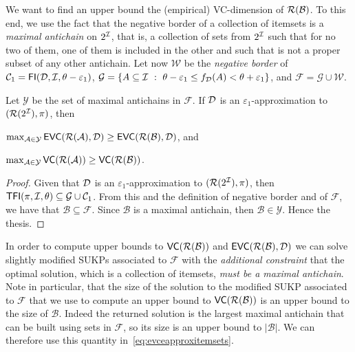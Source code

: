We want to find an upper bound the (empirical) VC-dimension of
$\mathcal{R}(\mathcal{B})$. To this end, we use the fact that the negative border of
a collection of itemsets is a \emph{maximal antichain} on $2^{\cal I}$, that is, a
collection of sets from $2^{\cal I}$ such that for no two of them, one of them is
included in the other and such that is not a proper subset of any other
antichain. Let now $\mathcal{W}$ be the \emph{negative border} of
$\mathcal{C}_1=\mathsf{FI}({\cal D},{\cal I},\theta-\varepsilon_1)$,
$\mathcal{G}=\{A\subseteq{\cal I} ~:~ \theta-\varepsilon_1\le
f_{\cal D}(A)<\theta+\varepsilon_1\}$, and $\mathcal{F}=\mathcal{G}\cup\mathcal{W}$.

\begin{lemma}\label{lem:antichains}
  Let $\mathcal{Y}$ be the set of maximal antichains in $\mathcal{F}$. If
  ${\cal D}$ is an $\varepsilon_1$-approximation to $(\mathcal{R}(2^{\cal I}),\pi)$, then
  \begin{enumerate*}
    \item
      $\max_{\mathcal{A}\in\mathcal{Y}}\mathsf{EVC}(\mathcal{R}(\mathcal{A}),{\cal D})\ge\mathsf{EVC}(\mathcal{R}(\mathcal{B}),{\cal D})$,
      and
    \item
      $\max_{\mathcal{A}\in\mathcal{Y}}\mathsf{VC}(\mathcal{R}(\mathcal{A}))\ge\mathsf{VC}(\mathcal{R}(\mathcal{B}))$.
  \end{enumerate*}
\end{lemma}

\begin{proof}
  Given that ${\cal D}$ is an $\varepsilon_1$-approximation to
  $(\mathcal{R}(2^{\cal I}),\pi)$, then
  $\mathsf{TFI}(\pi,{\cal I},\theta)\subseteq\mathcal{G}\cup\mathcal{C}_1$.  From this and
  the definition of negative border and of $\mathcal{F}$, we have that
  $\mathcal{B}\subseteq\mathcal{F}$. Since $\mathcal{B}$ is a maximal antichain,
  then $\mathcal{B}\in\mathcal{Y}$. Hence the thesis.
\end{proof}

In order to compute upper bounds to $\mathsf{VC}(\mathcal{R}(\mathcal{B}))$ and
$\mathsf{EVC}(\mathcal{R}(\mathcal{B}),{\cal D})$ we can solve slightly modified SUKPs
associated to $\mathcal{F}$ with the \emph{additional constraint} that the
optimal solution, which is a collection of itemsets, \emph{must be a maximal
antichain}. Note in particular, that the size of the solution to the modified
SUKP associated to $\mathcal{F}$ that we use to compute an upper bound to
$\mathsf{VC}(\mathcal{R}(\mathcal{B}))$ is an upper bound to the size of $\mathcal{B}$.
Indeed the returned solution is the largest maximal antichain that can be built
using sets in $\mathcal{F}$, so its size is an upper bound to $|\mathcal{B}|$.
We can therefore use this quantity in~\eqref{eq:evceapproxitemsets}.

